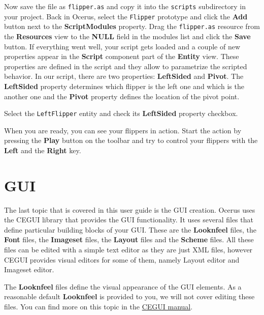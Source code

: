 \documentclass[a4paper,12pt]{article}
\begin{document}


Now save the file as \texttt{flipper.as} and copy it into the \texttt{scripts} subdirectory in your project. Back in Ocerus, select the \texttt{Flipper} prototype and click the \textbf{Add} button next to the \textbf{ScriptModules} property. Drag the \texttt{flipper.as} resource from the \textbf{Resources} view to the \textbf{NULL} field in the modules list and click the \textbf{Save} button.
If everything went well, your script gets loaded and a couple of new properties appear in the \textbf{Script} component part of the \textbf{Entity} view. These properties are defined in the script and they allow to parametrize the scripted behavior. In our script, there are two properties: \textbf{LeftSided} and \textbf{Pivot}. The \textbf{LeftSided} property determines which flipper is the left one and which is the another one and the \textbf{Pivot} property defines the location of the pivot point.

Select the \texttt{LeftFlipper} entity and check its \textbf{LeftSided} property checkbox. 

When you are ready, you can see your flippers in action. Start the action by pressing the \textbf{Play} button on the toolbar and try to control your flippers with the \textbf{Left} and the \textbf{Right} key.


\section{GUI}
The last topic that is covered in this user guide is the GUI creation. Ocerus uses the CEGUI library that provides the GUI functionality. It uses several files that define particular building blocks of your GUI. These are the \textbf{Looknfeel} files, the \textbf{Font} files, the \textbf{Imageset} files, the \textbf{Layout} files and the \textbf{Scheme} files. All these files can be edited with a simple text editor as they are just XML files, however CEGUI provides visual editors for some of them, namely Layout editor and Imageset editor.

The \textbf{Looknfeel} files define the visual appearance of the GUI elements. As a reasonable default \textbf{Looknfeel} is provided to you, we will not cover editing these files. You can find more on this topic in the \href{http://www.cegui.org.uk/api_reference/fal_man.html}{CEGUI manual}.
\end{document}
